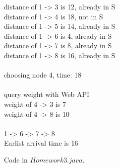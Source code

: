 \documentclass[14pt, a4paper]{article}
\begin{document}
\begin{enumerate}
\begin{enumerate}[label*=\arabic*]
\begin{tcolorbox}[enhanced jigsaw,breakable,pad at break*=1mm,colback=gray!10!white,frame hidden]
distance of 1 -> 3 is 12, already in S\\
distance of 1 -> 4 is 18, not in S\\
distance of 1 -> 5 is 14, already in S\\
distance of 1 -> 6 is 4, already in S\\
distance of 1 -> 7 is 8, already in S\\
distance of 1 -> 8 is 16, already in S\\
\\
choosing node 4, time: 18\\
\\
query weight with Web API\\
weight of 4 -> 3 is 7\\
weight of 4 -> 8 is 10\\
\\
1 -> 6 -> 7 -> 8\\
Earlist arrival time is 16
\end{tcolorbox}

\end{enumerate}

\end{enumerate} 

\newpage

Code in $Homework3.java$.
\end{document}

